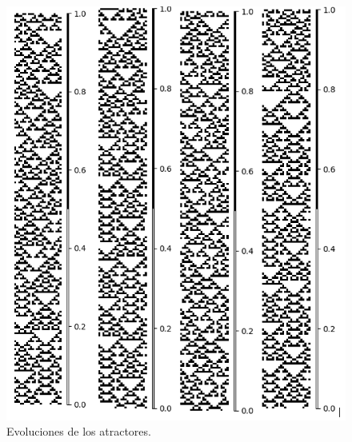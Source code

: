 \documentclass[11pt]{article}
\begin{document}
			\begin{figure}[H]
			\centering
			\includegraphics[scale=0.3]{resources/Atractores22/atractor_22_size_24_res.png}
			\caption{Evoluciones de los atractores.}\label{fig:picture}
			\end{figure}
\end{document}
